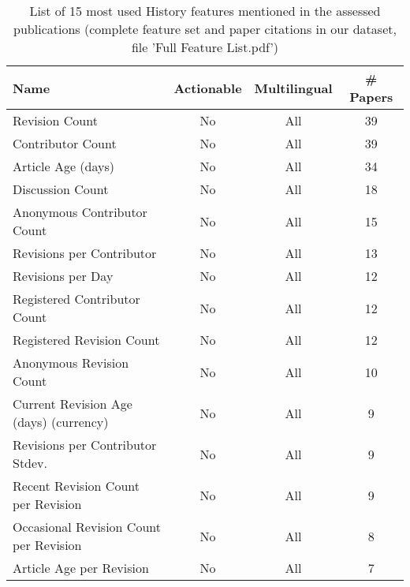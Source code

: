 \begin{table}[htbp]
    \caption{List of 15 most used History features mentioned in the assessed publications (complete feature set and paper citations in our dataset, file 'Full Feature List.pdf')}
    \label{tab:feat_History}
    \centering
    \begin{tabular}{m{} c c c}
        \toprule
        \textbf{Name} & \textbf{Actionable} & \textbf{Multilingual} & \textbf{\# Papers} \\ 
        \midrule
        Revision Count & No & All & 39 \\
        Contributor Count & No & All & 39 \\
        Article Age (days) & No & All & 34 \\
        Discussion Count & No & All & 18 \\
        Anonymous Contributor Count & No & All & 15 \\
        Revisions per Contributor & No & All & 13 \\
        Revisions per Day & No & All & 12 \\
        Registered Contributor Count & No & All & 12 \\
        Registered Revision Count & No & All & 12 \\
        Anonymous Revision Count & No & All & 10 \\
        Current Revision Age (days) (currency) & No & All & 9 \\
        Revisions per Contributor Stdev. & No & All & 9 \\
        Recent Revision Count per Revision & No & All & 9 \\
        Occasional Revision Count per Revision  & No & All & 8 \\
        Article Age per Revision & No & All & 7 \\
        \bottomrule
    \end{tabular}
\end{table}